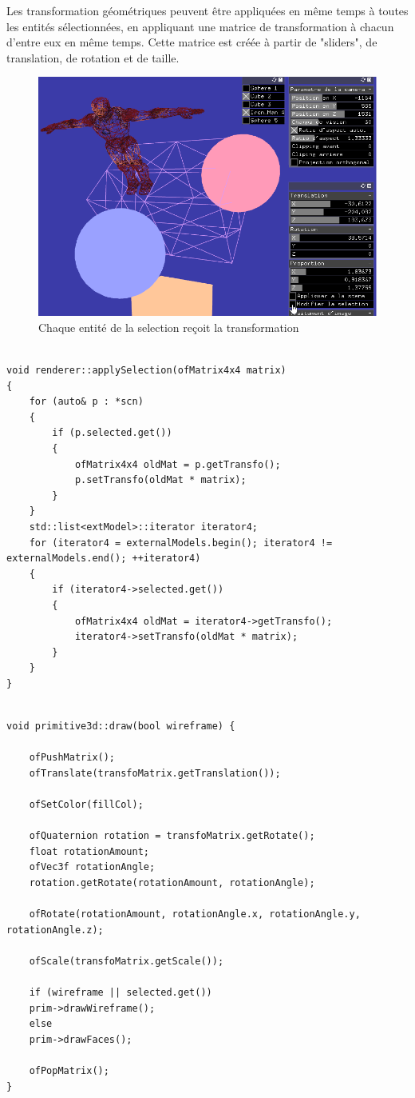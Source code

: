 \newpage

Les transformation géométriques peuvent être appliquées en même temps à toutes les entités sélectionnées, en appliquant une matrice de transformation à chacun d'entre eux en même temps. Cette matrice est créée à partir de "sliders", de translation, de rotation et de taille.

\begin{figure}[h]
	\centering
	\includegraphics[width=18cm]{fig/transformationSelection.png}
	\caption{Chaque entité de la selection reçoit la transformation}
	\label{fig:test}
\end{figure}

\begin{lstlisting}

void renderer::applySelection(ofMatrix4x4 matrix)
{
	for (auto& p : *scn)
	{
		if (p.selected.get())
		{
			ofMatrix4x4 oldMat = p.getTransfo();
			p.setTransfo(oldMat * matrix);
		}
	}
	std::list<extModel>::iterator iterator4;
	for (iterator4 = externalModels.begin(); iterator4 != externalModels.end(); ++iterator4)
	{
		if (iterator4->selected.get())
		{
			ofMatrix4x4 oldMat = iterator4->getTransfo();
			iterator4->setTransfo(oldMat * matrix);
		}
	}
}
\end{lstlisting}

\begin{lstlisting}

void primitive3d::draw(bool wireframe) {

	ofPushMatrix();
	ofTranslate(transfoMatrix.getTranslation());
	
	ofSetColor(fillCol);
	
	ofQuaternion rotation = transfoMatrix.getRotate();
	float rotationAmount;
	ofVec3f rotationAngle;
	rotation.getRotate(rotationAmount, rotationAngle);
	
	ofRotate(rotationAmount, rotationAngle.x, rotationAngle.y, rotationAngle.z);
	
	ofScale(transfoMatrix.getScale());
	
	if (wireframe || selected.get())
	prim->drawWireframe();
	else
	prim->drawFaces();
	
	ofPopMatrix();
}

\end{lstlisting}

